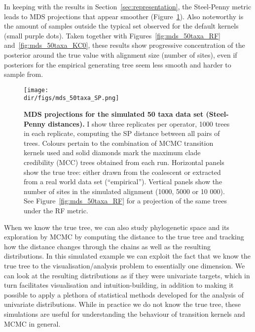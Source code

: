 In keeping with the results in Section~\ref{sec:representation}, the Steel-Penny metric leads to MDS projections that appear smoother (Figure~\ref{fig:mds_50taxa_SP}).
Also noteworthy is the amount of samples outside the typical set observed for the default kernels (small purple dots). 
Taken together with Figures~\ref{fig:mds_50taxa_RF} and~\ref{fig:mds_50taxa_KC0}, these results show progressive concentration of the posterior around the true value with alignment size (number of sites), even if posteriors for the empirical generating tree seem less smooth and harder to sample from.
\begin{figure}[!ht]
\begin{center}
\texttt{[image: \\dir/figs/mds\_50taxa\_SP.png]} 
\end{center}
 \caption[MDS projections for the simulated 50 taxa data set (Steel-Penny distances).]{\textbf{MDS projections for the simulated 50 taxa data set (Steel-Penny distances).}
 I show three replicates per operator, 1000 trees in each replicate, computing the SP distance between all pairs of trees.
 Colours pertain to the combination of MCMC transition kernels used and solid diamonds mark the maximum clade credibility (MCC) trees obtained from each run.
 Horizontal panels show the true tree: either drawn from the coalescent or extracted from a real world data set (``empirical'').
 Vertical panels show the number of sites in the simulated alignment (1000, 5000 or 10 000).
 See Figure~\ref{fig:mds_50taxa_RF} for a projection of the same trees under the RF metric.
 }
\label{fig:mds_50taxa_SP}
\end{figure}

When we know the true tree, we can also study phylogenetic space and its exploration by MCMC by computing the distance to the true tree and tracking how the distance changes through the chains as well as the resulting distributions.
In this simulated example we can exploit the fact that we know the true tree to the visualisation/analysis problem to essentially one dimension.
We can look at the resulting distributions as if they were univariate targets, which in turn facilitates visualisation and intuition-building, in addition to making it possible to apply a plethora of statistical methods developed for the analysis of univariate distributions.
While in practice we do not know the true tree, these simulations are useful for understanding the behaviour of transition kernels and MCMC in general. 

